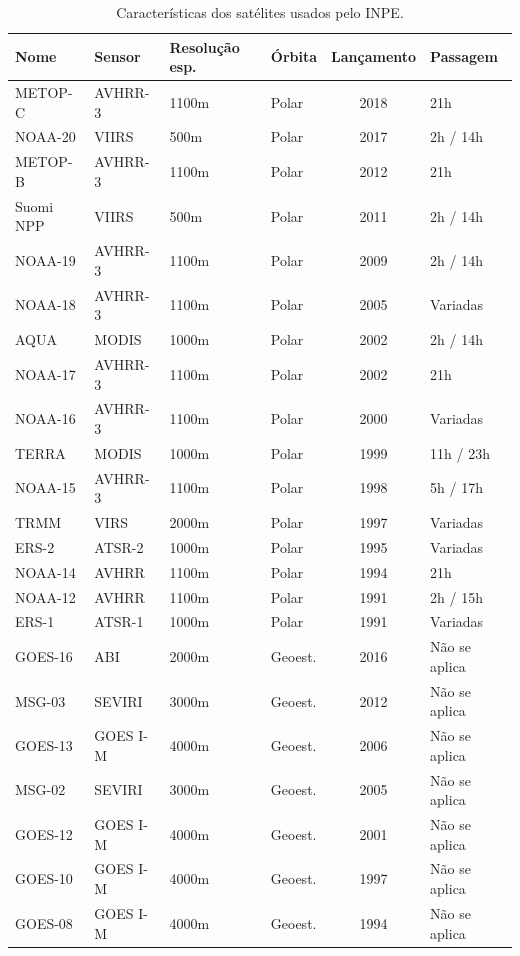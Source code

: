 \documentclass[cic,tc]{iiufrgs}
\begin{document}
\begin{table}[htbp]
\centering
\caption{Características dos satélites usados pelo INPE.}
\begin{tabular}{ @{}llllcl@{} }
  \toprule
  Nome    & Sensor & Resolução esp. & Órbita & Lançamento & Passagem \\
  \midrule
  METOP-C & AVHRR-3  & 1100m       & Polar   & 2018 & 21h \\
  NOAA-20 & VIIRS    & 500m        & Polar   & 2017 & 2h / 14h \\
  METOP-B & AVHRR-3  & 1100m       & Polar   & 2012 & 21h \\
  Suomi NPP & VIIRS  & 500m        & Polar   & 2011 & 2h / 14h \\
  NOAA-19 & AVHRR-3  & 1100m       & Polar   & 2009 & 2h / 14h \\
  NOAA-18 & AVHRR-3  & 1100m       & Polar   & 2005 & Variadas \\
  AQUA    & MODIS    & 1000m       & Polar   & 2002 & 2h / 14h \\
  NOAA-17 & AVHRR-3  & 1100m       & Polar   & 2002 & 21h \\
  NOAA-16 & AVHRR-3  & 1100m       & Polar   & 2000 & Variadas \\
  TERRA   & MODIS    & 1000m       & Polar   & 1999 & 11h / 23h \\
  NOAA-15 & AVHRR-3  & 1100m       & Polar   & 1998 & 5h / 17h \\
  TRMM    & VIRS     & 2000m       & Polar   & 1997 & Variadas \\
  ERS-2   & ATSR-2   & 1000m       & Polar   & 1995 & Variadas \\
  NOAA-14 & AVHRR    & 1100m       & Polar   & 1994 & 21h \\
  NOAA-12 & AVHRR    & 1100m       & Polar   & 1991 & 2h / 15h \\
  ERS-1   & ATSR-1   & 1000m       & Polar   & 1991 & Variadas \\
  GOES-16 & ABI      & 2000m       & Geoest. & 2016 & Não se aplica \\
  MSG-03  & SEVIRI   & 3000m       & Geoest. & 2012 & Não se aplica \\
  GOES-13 & GOES I-M & 4000m       & Geoest. & 2006 & Não se aplica \\
  MSG-02  & SEVIRI   & 3000m       & Geoest. & 2005 & Não se aplica \\
  GOES-12 & GOES I-M & 4000m       & Geoest. & 2001 & Não se aplica \\
  GOES-10 & GOES I-M & 4000m       & Geoest. & 1997 & Não se aplica \\
  GOES-08 & GOES I-M & 4000m       & Geoest. & 1994 & Não se aplica \\
  \bottomrule
\end{tabular}
\label{table:satelites}
\end{table}
\end{document}
